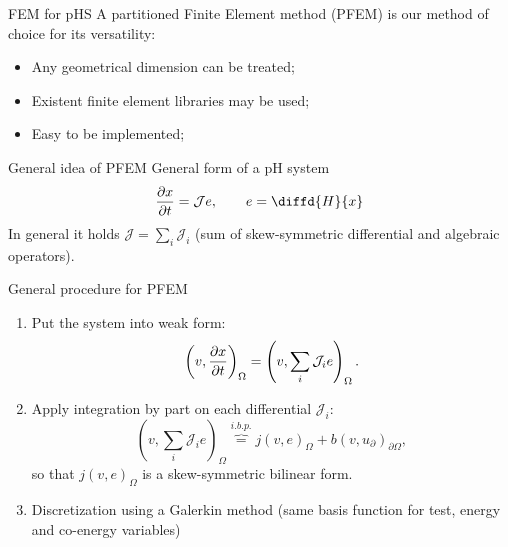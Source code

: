 \documentclass[aspectratio=169]{ISAE-Beamer}
\begin{document}
\begin{frame}{FEM for pHS }
A partitioned Finite Element method (PFEM) is our method of choice for its versatility:
\begin{itemize}
	\item Any geometrical dimension can be treated;
	\item Existent finite element libraries may be used;
	\item Easy to be implemented;
\end{itemize}
\end{frame}

\begin{frame}{General idea of PFEM}
General form of a pH system
\begin{equation*}
	\diffp{x}{t} = \mathcal{J} e, \qquad e = \diffd{H}{x}
\end{equation*}
In general it holds $\mathcal{J} = \sum_i \mathcal{J}_i$ (sum of skew-symmetric differential and algebraic operators). \\
\begin{block}{General procedure for PFEM}
\setlength{\abovedisplayskip}{1pt}
\setlength{\belowdisplayskip}{1pt}
\begin{enumerate}
\item Put the system into weak form:
\begin{equation*}
\left(v, \diffp{x}{t} \right)_{\Omega} = \left(v, \sum_i \mathcal{J}_i e \right)_{\Omega}.
\end{equation*}
\item Apply integration by part on each differential $\mathcal{J}_i$:
\begin{equation*}
\left(v, \sum_i \mathcal{J}_i e \right)_{\Omega} \overbrace{=}^{i.b.p.} j(v, e)_{\Omega} + b(v, u_\partial)_{\partial \Omega},
\end{equation*}
so that $j(v, e)_{\Omega}$ is a skew-symmetric bilinear form.
\item Discretization using a Galerkin method (same basis function for test, energy and co-energy variables)
\end{enumerate}
\end{block}
\end{frame}
\end{document}
